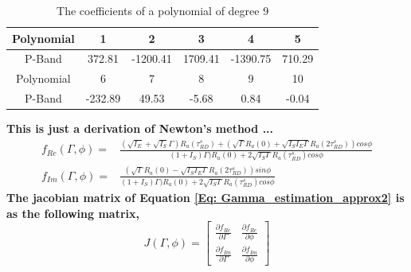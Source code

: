 \documentclass[draftcls,onecolumn]{IEEEtran}  %
\begin{document}
\begin{table}[ht]
\centering
\begin{tabular}  {|c|c|c|c|c|c|}
	\hline
     Polynomial &1&2 &3&4&5\\
    \hline
   P-Band & 372.81 & -1200.41 &	1709.41 & -1390.75 & 710.29\\
     \hline
     Polynomial &6&7&8&9 &10\\
    \hline
   P-Band & -232.89 &	49.53 &	-5.68 & 0.84 & -0.04 \\
    \hline
\end{tabular}
\caption{The coefficients of a polynomial of degree 9}
\label{Table:Polynomial_fitting}
\end{table}


\bf This is just a derivation of Newton's method ... \rm
\begin{eqnarray}
f_{Re}(\Gamma, \phi)=&\frac{(\sqrt{I_E}+\sqrt{I_S}\Gamma)R_a(\tau^s_{RD})+(\sqrt{\Gamma} R_a(0)+\sqrt{I_S I_E\Gamma} R_a(2\tau^s_{RD}))cos\phi}                              
                   {(1 + I_S)\Gamma)R_a(0)+2\sqrt{I_S\Gamma} R_a(\tau^s_{RD})cos\phi}   \\
f_{Im}(\Gamma, \phi)=&\frac{(\sqrt{\Gamma} R_a(0)-\sqrt{I_S I_E\Gamma} R_a(2\tau^s_{RD}))sin\phi }                             
                   {(1 + I_S)\Gamma)R_a(0)+2\sqrt{I_S\Gamma} R_a(\tau^s_{RD})cos\phi}   
    \label{Eq: Gamma_estimation_approx2}
\end{eqnarray}
The jacobian matrix of Equation \ref{Eq: Gamma_estimation_approx2} is as the following matrix, 
\begin{equation}
    J(\Gamma, \phi) =
    \begin{bmatrix}
        \frac{\partial f_{Re}}{\partial \Gamma}      &  \frac{\partial f_{Re}}{\partial \phi}  \\
        \frac{\partial f_{Im}}{\partial \Gamma}      &  \frac{\partial f_{Im}}{\partial \phi}  
    \end{bmatrix} \label{Eq: Jacobian}
\end{equation}
\end{document}
